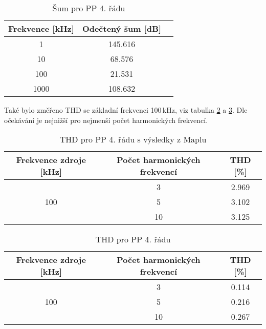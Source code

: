   \begin{table}[h]
\centering
  \begin{tabular}{ | c | c | c |}
    \hline
     Frekvence [kHz] & Odečtený šum [dB] \\ \hline
    1 & 145.616 \\ \hline
    10 & 68.576 \\ \hline
    100 & 21.531 \\ \hline
    1000 & 108.632 \\ \hline
  \end{tabular}
\caption[Šum pro PP 4. řádu]{Šum pro PP 4. řádu \label{s:THD2}}
\end{table}
\noindent Také bylo změřeno THD se základní frekvenci 100\,kHz, viz tabulka \ref{s:THD3} a \ref{s:THD4}. Dle očekávání je nejnižší pro nejmenší počet harmonických frekvencí.
\begin{table}[h]
\centering
\renewcommand{\arraystretch}{1.15}
  \begin{tabular}{ | c | c | c |}
    \hline
    Frekvence zdroje [kHz] & Počet harmonických frekvencí & THD [\%] \\ \hline
	\multirow{3}{*}{100} & 3 & 2.969\\& 5 & 3.102 \\& 10 & 3.125 \\ \hline
  \end{tabular}
  \caption[THD pro PP 4. řádu (Maple)]{THD pro PP 4. řádu s výsledky z Maplu \label{s:THD3}}
\end{table}
\begin{table}[h]
\centering
\renewcommand{\arraystretch}{1.15}
  \begin{tabular}{ | c | c | c |} 
    \hline
     Frekvence zdroje [kHz] & Počet harmonických frekvencí & THD [\%] \\ \hline
	\multirow{3}{*}{100} & 3 & 0.114\\& 5 & 0.216 \\& 10 & 0.267 \\ \hline
  \end{tabular}
  \caption[THD pro PP 4. řádu]{THD pro PP 4. řádu \label{s:THD4}}
\end{table}